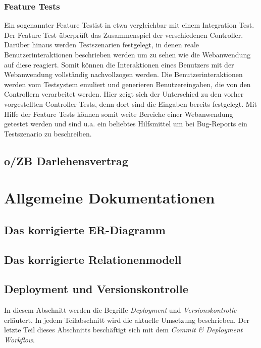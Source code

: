 \documentclass[12pt,             %
               a4paper,          %
               listof=totoc,     %
               index=totoc,      %
               bibliography=totoc,%
               oneside,         %
               BCOR1cm,          %
               english   %
               ]{scrbook}
\begin{document}
\subsection{Feature Tests}
Ein sogenannter \glqq Feature Test\grqq ist in etwa vergleichbar mit einem \glqq Integration Test\grqq. Der Feature Test überprüft das Zusammenspiel der verschiedenen Controller. Darüber hinaus werden Testszenarien festgelegt, in denen reale Benutzerinteraktionen beschrieben werden um zu sehen wie die Webanwendung auf diese reagiert. Somit können die Interaktionen eines Benutzers mit der Webanwendung vollständig nachvollzogen werden. Die Benutzerinteraktionen werden vom Testsystem emuliert und generieren Benutzereingaben, die von den Controllern verarbeitet werden. Hier zeigt sich der Unterschied zu den vorher vorgestellten Controller Tests, denn dort sind die Eingaben bereits festgelegt. Mit Hilfe der Feature Tests können somit weite Bereiche einer Webanwendung getestet werden und sind u.a. ein beliebtes Hilfsmittel um bei Bug-Reports ein Testszenario zu beschreiben.


\section{o/ZB Darlehensvertrag}

\clearpage
\chapter{Allgemeine Dokumentationen}
\section{Das korrigierte ER-Diagramm}

\section{Das korrigierte Relationenmodell}

\section{Deployment und Versionskontrolle}
In diesem Abschnitt werden die Begriffe \textit{Deployment} und \textit{Versionskontrolle} erläutert. In jedem Teilabschnitt wird die aktuelle Umsetzung beschrieben. Der letzte Teil dieses Abschnitts beschäftigt sich mit dem \textit{Commit \& Deployment Workflow}.
\end{document}
